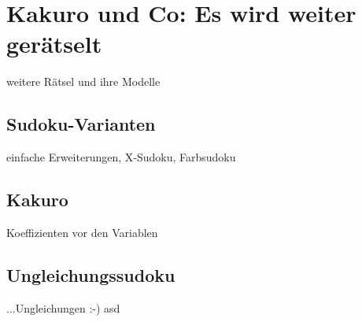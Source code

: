 \chapter{Kakuro und Co: Es wird weiter gerätselt}
\label{chap_andere}

weitere Rätsel und ihre Modelle

\section{Sudoku-Varianten}
einfache Erweiterungen, X-Sudoku, Farbsudoku

\section{Kakuro}
Koeffizienten vor den Variablen

\section{Ungleichungssudoku}
...Ungleichungen :-)
asd

